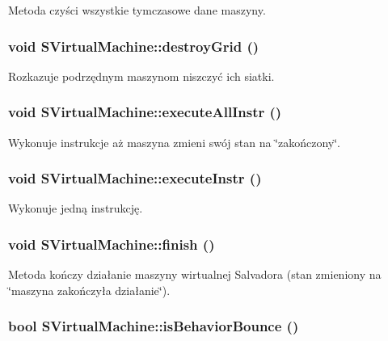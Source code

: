 Metoda czyści wszystkie tymczasowe dane maszyny. \hypertarget{classSVirtualMachine_74f8812f8711a172f9ad3a3f92446af7}{
\subsubsection[{destroyGrid}]{\setlength{\rightskip}{0pt plus 5cm}void SVirtualMachine::destroyGrid ()}}
\label{classSVirtualMachine_74f8812f8711a172f9ad3a3f92446af7}


Rozkazuje podrzędnym maszynom niszczyć ich siatki. \hypertarget{classSVirtualMachine_f3874f10dac15f27b23dc4b976271413}{
\subsubsection[{executeAllInstr}]{\setlength{\rightskip}{0pt plus 5cm}void SVirtualMachine::executeAllInstr ()}}
\label{classSVirtualMachine_f3874f10dac15f27b23dc4b976271413}


Wykonuje instrukcje aż maszyna zmieni swój stan na \char`\"{}zakończony\char`\"{}. \hypertarget{classSVirtualMachine_200c4aae4eedf52ba7a3754295505186}{
\subsubsection[{executeInstr}]{\setlength{\rightskip}{0pt plus 5cm}void SVirtualMachine::executeInstr ()}}
\label{classSVirtualMachine_200c4aae4eedf52ba7a3754295505186}


Wykonuje jedną instrukcję. \hypertarget{classSVirtualMachine_5eb2195ecac5f0bed11b2318cf8feed2}{
\subsubsection[{finish}]{\setlength{\rightskip}{0pt plus 5cm}void SVirtualMachine::finish ()}}
\label{classSVirtualMachine_5eb2195ecac5f0bed11b2318cf8feed2}


Metoda kończy działanie maszyny wirtualnej Salvadora (stan zmieniony na \char`\"{}maszyna zakończyła działanie\char`\"{}). \hypertarget{classSVirtualMachine_51a4d5a2dc91059e261135b150a78034}{
\subsubsection[{isBehaviorBounce}]{\setlength{\rightskip}{0pt plus 5cm}bool SVirtualMachine::isBehaviorBounce ()}}
\label{classSVirtualMachine_51a4d5a2dc91059e261135b150a78034}


